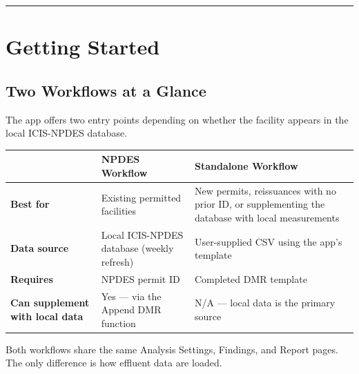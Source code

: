 \documentclass[
  11pt,
  letterpaper,
  DIV=11,
  numbers=noendperiod]{scrartcl}
\newcounter{none} %
\begin{document}
\begin{center}\rule{0.5\linewidth}{0.5pt}\end{center}

\section{Getting Started}\label{sec-getting-started}

\subsection{Two Workflows at a Glance}\label{sec-workflows}

The app offers two entry points depending on whether the facility
appears in the local ICIS-NPDES database.

{\def\LTcaptype{none} %
\begin{longtable}[]{@{}
  >{\raggedright\arraybackslash}p{}
  >{\raggedright\arraybackslash}p{}
  >{\raggedright\arraybackslash}p{}@{}}
\toprule\noalign{}
\begin{minipage}[b]{\linewidth}\raggedright
\end{minipage} & \begin{minipage}[b]{\linewidth}\raggedright
\textbf{NPDES Workflow}
\end{minipage} & \begin{minipage}[b]{\linewidth}\raggedright
\textbf{Standalone Workflow}
\end{minipage} \\
\midrule\noalign{}
\endhead
\bottomrule\noalign{}
\endlastfoot
\textbf{Best for} & Existing permitted facilities & New permits,
reissuances with no prior ID, or supplementing the database with local
measurements \\
\textbf{Data source} & Local ICIS-NPDES database (weekly refresh) &
User-supplied CSV using the app's template \\
\textbf{Requires} & NPDES permit ID & Completed DMR template \\
\textbf{Can supplement with local data} & Yes --- via the Append DMR
function & N/A --- local data is the primary source \\
\end{longtable}
}

Both workflows share the same Analysis Settings, Findings, and Report
pages. The only difference is how effluent data are loaded.
\end{document}
